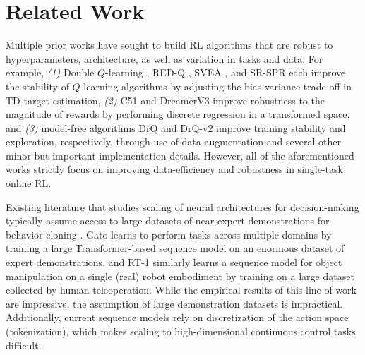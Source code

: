 \documentclass{article}
\begin{document}
\vspace{-0.05in}
\section{Related Work}
\label{sec:related-work}
\vspace{-0.05in}
Multiple prior works have sought to build RL algorithms that are robust to hyperparameters, architecture, as well as variation in tasks and data. For example, \emph{(1)} Double $Q$-learning \citep{Hasselt2016DeepRL}, RED-Q \citep{chen2021randomized}, SVEA \citep{hansen2021stabilizing}, and SR-SPR \citep{doro2023sampleefficient} each improve the stability of $Q$-learning algorithms by adjusting the bias-variance trade-off in TD-target estimation, \emph{(2)} C51 \citep{bellemare2017distributional} and DreamerV3 \citep{hafner2023dreamerv3} improve robustness to the magnitude of rewards by performing discrete regression in a transformed space, and \emph{(3)} model-free algorithms DrQ \citep{kostrikov2020image} and DrQ-v2 \citep{yarats2021drqv2} improve training stability and exploration, respectively, through use of data augmentation and several other minor but important implementation details. However, all of the aforementioned works strictly focus on improving data-efficiency and robustness in single-task online RL.

Existing literature that studies scaling of neural architectures for decision-making typically assume access to large datasets of near-expert demonstrations for behavior cloning \citep{reed2022generalist,lee2022multi,kumar2022should,schubert2023generalist,driess2023palm,brohan2023rt}. Gato \citep{reed2022generalist} learns to perform tasks across multiple domains by training a large Transformer-based sequence model \citep{vaswani2017attention} on an enormous dataset of expert demonstrations, and RT-1 \citep{brohan2023rt} similarly learns a sequence model for object manipulation on a single (real) robot embodiment by training on a large dataset collected by human teleoperation. While the empirical results of this line of work are impressive, the assumption of large demonstration datasets is impractical. Additionally, current sequence models rely on discretization of the action space (tokenization), which makes scaling to high-dimensional continuous control tasks difficult.
\end{document}
